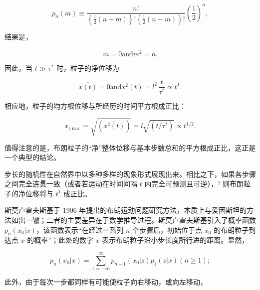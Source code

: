 \begin{equation}\tag{15.2.1}\label{eq:15.2.1}
p _ { n } ( m ) \equiv \frac { n ! } { \left\{ \frac { 1 } { 2 } ( n + m ) \right\} ! \left\{ \frac { 1 } { 2 } ( n - m ) \right\} ! } \left( \frac { 1 } { 2 } \right) ^{n} ,
\end{equation}

结果是，

\begin{equation}\tag{15.2.2}\label{eq:15.2.2}
{ \overline { { m } } } = 0  { \mathrm { a n d } }  { \overline { { m ^{2} } } } = n .
\end{equation}

因此，当 \(t \gg \tau^{*}\) 时，粒子的净位移为

\begin{equation}\tag{15.2.3}\label{eq:15.2.3}
\overline { { x ( t ) } } = 0  \mathrm { a n d }  \overline { { x ^{2} ( t ) } } = l ^{2} \, \frac { t } { \tau ^{*} } \propto t ^{1} .
\end{equation}

相应地，粒子的均方根位移与所经历的时间平方根成正比：

\begin{equation}\tag{15.2.4}\label{eq:15.2.4}
x _ { \mathrm { r . m . s . } } = \sqrt { \left( \overline { { x ^{2} ( t ) } } \right) } = l \sqrt { ( t / \tau ^{*} ) } \propto t ^{1 / 2} .
\end{equation}

值得注意的是，布朗粒子的``净''整体位移与基本步数总和的平方根成正比，这正是一个典型的结论。

步长的随机性在自然界中以多种多样的现象形式展现出来。相比之下，如果各步骤之间完全连贯一致（或者若运动在时间间隔 \(t\) 内完全可预测且可逆），² 则布朗粒子的净位移将与 \(t^{1}\) 成正比。

斯莫卢霍夫斯基于 1906 年提出的布朗运动问题研究方法，本质上与爱因斯坦的方法如出一辙；二者的主要差异在于数学推导过程。斯莫卢霍夫斯基引入了概率函数 \(p_{n}(x_{0}|x)\)，该函数表示``在经过一系列 \(n\) 个步骤后，初始位于点 \(x_{0}\) 的布朗粒子到达点 \(x\) 的概率''；此处的数字 \(x\) 表示布朗粒子沿小步长度所行进的距离。显然，

\begin{equation}\tag{15.2.5}\label{eq:15.2.5}
p _ { n } ( x _ { 0 } | x ) = \sum _ { z = - \infty } ^{\infty} p _ { n - 1 } ( x _ { 0 } | z ) p _ { 1 } ( z | x )  ( n \geq 1 ) ;
\end{equation}

此外，由于每次一步都同样有可能使粒子向右移动，或向左移动，

